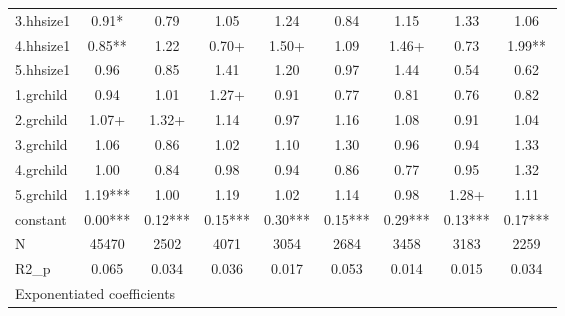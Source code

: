 {\begin{tabular}{l*{8}{c}}
3.hhsize1   &        0.91*  &        0.79   &        1.05   &        1.24   &        0.84   &        1.15   &        1.33   &        1.06   \\
4.hhsize1   &        0.85** &        1.22   &        0.70+  &        1.50+  &        1.09   &        1.46+  &        0.73   &        1.99** \\
5.hhsize1   &        0.96   &        0.85   &        1.41   &        1.20   &        0.97   &        1.44   &        0.54   &        0.62   \\
1.grchild   &        0.94   &        1.01   &        1.27+  &        0.91   &        0.77   &        0.81   &        0.76   &        0.82   \\
2.grchild   &        1.07+  &        1.32+  &        1.14   &        0.97   &        1.16   &        1.08   &        0.91   &        1.04   \\
3.grchild   &        1.06   &        0.86   &        1.02   &        1.10   &        1.30   &        0.96   &        0.94   &        1.33   \\
4.grchild   &        1.00   &        0.84   &        0.98   &        0.94   &        0.86   &        0.77   &        0.95   &        1.32   \\
5.grchild   &        1.19***&        1.00   &        1.19   &        1.02   &        1.14   &        0.98   &        1.28+  &        1.11   \\
constant    &        0.00***&        0.12***&        0.15***&        0.30***&        0.15***&        0.29***&        0.13***&        0.17***\\
\hline
N           &       45470   &        2502   &        4071   &        3054   &        2684   &        3458   &        3183   &        2259   \\
R2\_p        &       0.065   &       0.034   &       0.036   &       0.017   &       0.053   &       0.014   &       0.015   &       0.034   \\
\hline\hline
\multicolumn{9}{l}{\footnotesize Exponentiated coefficients}\\
\end{tabular}
}
